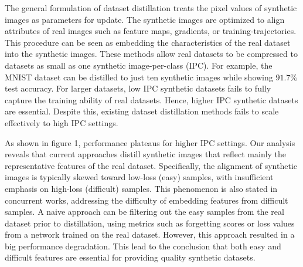 \documentclass{article}
\theoremstyle{plain}
\theoremstyle{definition}
\theoremstyle{remark}
\begin{document}
The general formulation of dataset distillation treats the pixel values of synthetic images as parameters for update. The synthetic images are optimized to align attributes of real images such as feature maps, gradients, or training-trajectories. This procedure can be seen as embedding the characteristics of the real dataset into the synthetic images. These methods allow real datasets to be compressed to datasets as small as one synthetic image-per-class (IPC). For example, the MNIST dataset can be distilled to just ten synthetic images while showing $91.7\%$ test accuracy. For larger datasets, low IPC synthetic datasets fails to fully capture the training ability of real datasets. Hence, higher IPC synthetic datasets are essential. Despite this, existing dataset distillation methods fails to scale effectively to high IPC settings. 

As shown in figure 1, performance plateaus for higher IPC settings. Our analysis reveals that current approaches distill synthetic images that reflect mainly the representative features of the real dataset. Specifically, the alignment of synthetic images is typically skewed toward low-loss (easy) samples, with insufficient emphasis on high-loss (difficult) samples. This phenomenon is also stated in concurrent works, addressing the difficulty of embedding features from difficult samples. A naive approach can be filtering out the easy samples from the real dataset prior to distillation, using metrics such as forgetting scores or loss values from a network trained on the real dataset. However, this approach resulted in a big performance degradation. This lead to the conclusion that both easy and difficult features are essential for providing quality synthetic datasets.
\end{document}

